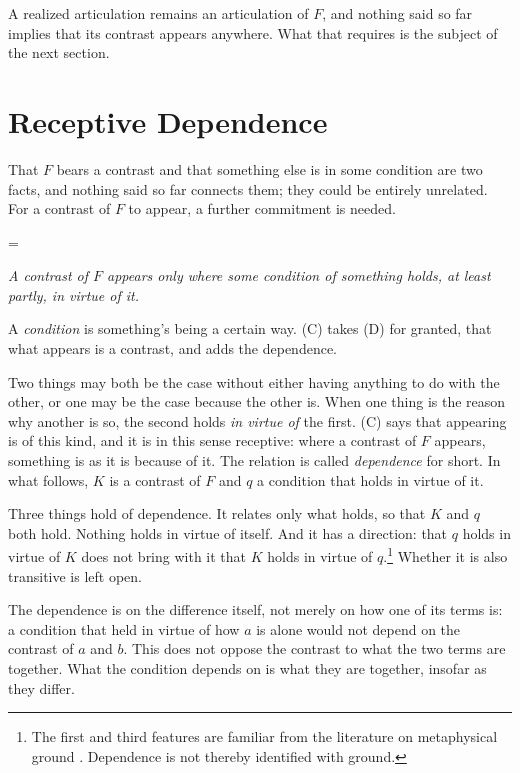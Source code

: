 \documentclass[11pt,a4paper,oneside]{scrartcl}
\makeatletter
\newenvironment{thesis}[2][]
  {\@beginparpenalty=\@M %
   \begin{list}{}{\setlength{\leftmargin}{2.2em}\setlength{\rightmargin}{2.2em}
                  \setlength{\topsep}{.9\baselineskip plus .2\baselineskip}}%
   \item\relax{\upshape\if\relax\detokenize{#1}\relax\else(#1)\enspace\fi\scshape\MakeLowercase{#2}}\par\nopagebreak\vspace{.2\baselineskip}\itshape\ignorespaces}
  {\end{list}}
\newcommand{\F}{\ensuremath{F}}
\makeatother
\begin{document}
A realized articulation remains an articulation of \F, and nothing said so far implies that its
contrast appears anywhere. What that requires is the subject of the next section.

\section{Receptive Dependence}\label{sec:dep}

That \F{} bears a contrast and that something else is in some condition are two facts, and nothing
said so far connects them; they could be entirely unrelated. For a contrast of \F{} to appear, a
further commitment is needed.

\begin{thesis}[C]{Receptive dependence}
  A contrast of \F{} appears only where some condition of something holds, at least partly, in
  virtue of it.
\end{thesis}

A \emph{condition} is something's being a certain way. (C) takes (D) for granted, that what appears
is a contrast, and adds the dependence.

Two things may both be the case without either having anything to do with the other, or one may be
the case because the other is. When one thing is the reason why another is so, the second holds
\emph{in virtue of} the first. (C) says that appearing is of this kind, and it is in this sense
receptive: where a contrast of \F{} appears, something is as it is because of it. The relation is
called \emph{dependence} for short. In what follows, $K$ is a contrast of \F{} and $q$ a condition
that holds in virtue of it.

Three things hold of dependence. It relates only what holds, so that $K$ and $q$ both
hold. Nothing holds in virtue of itself. And it has a direction: that $q$ holds in virtue of $K$
does not bring with it that $K$ holds in virtue of $q$.\footnote{The first and third features are
familiar from the literature on metaphysical ground \autocite{fine2012}. Dependence is not thereby identified with ground.} Whether it is also transitive is left open.

The dependence is on the difference itself, not merely on how one of its terms is: a condition that
held in virtue of how $a$ is alone would not depend on the contrast of $a$ and $b$. This does not
oppose the contrast to what the two terms are together. What the condition depends on is what they
are together, insofar as they differ.
\end{document}
